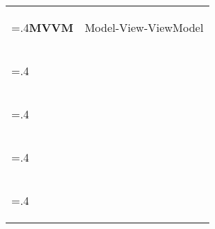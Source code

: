 \begin{tabularx}{\textwidth}{@{}>{\bfseries\raggedright\hsize=.4\hsize}X >{\hsize=1.6\hsize}X@{}}
    \textbf{MVVM}     & Model-View-ViewModel                             \label{MSP}\\
        \textbf{}     &                              \label{MSP}\\
    \textbf{}     &                              \label{MSP}\\
    \textbf{}     &                              \label{MSP}\\
    \textbf{}     &                              \label{MSP}\\






 \end{tabularx}